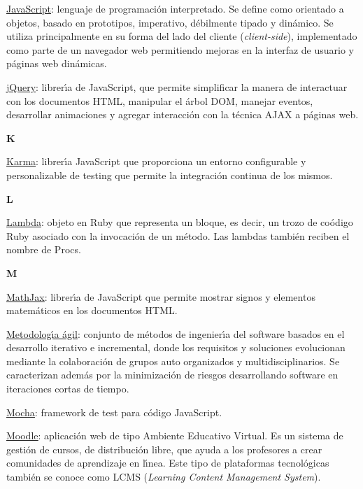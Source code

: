 \underline{JavaScript}: lenguaje de programaci\'on interpretado. Se define como orientado a objetos, basado en prototipos, imperativo, d\'ebilmente tipado y din\'amico. Se utiliza 
principalmente en su forma del lado del cliente (\textit{client-side}), implementado como parte de un navegador web permitiendo mejoras en la interfaz de usuario y p\'aginas web din\'amicas.
\bigskip

\href{https://jquery.com/}{\underline{jQuery}}: librer\'{\i}a de JavaScript, que permite simplificar la manera de interactuar con los documentos HTML, manipular el \'arbol DOM, manejar eventos, 
desarrollar animaciones y agregar interacci\'on con la t\'ecnica AJAX a p\'aginas web.
\bigskip

\bigskip
{\bfseries {\Huge K}}\label{Apendice1:K}
\bigskip
\bigskip

\href{https://karma-runner.github.io/0.12/index.html}{\underline{Karma}}: librer\'{\i}a JavaScript que proporciona un entorno configurable y personalizable de testing que permite la integraci\'on 
continua de los mismos.
\bigskip

\bigskip
{\bfseries {\Huge L}}\label{Apendice1:L}
\bigskip
\bigskip

\underline{Lambda}: objeto en Ruby que representa un bloque, es decir, un trozo de co\'odigo Ruby asociado con la invocaci\'on de un m\'etodo. Las lambdas tambi\'en reciben el nombre
de Procs.
\bigskip

\bigskip
{\bfseries {\Huge M}}\label{Apendice1:M}
\bigskip
\bigskip

\href{http://www.mathjax.org/}{\underline{MathJax}}: librer\'{\i}a de JavaScript que permite mostrar signos y elementos matem\'aticos en los documentos HTML.
\bigskip

\underline{Metodolog\'{\i}a \'agil}: conjunto de m\'etodos de ingenier\'{\i}a del software basados en el desarrollo iterativo e incremental, donde los requisitos y soluciones 
evolucionan mediante la colaboraci\'on de grupos auto organizados y multidisciplinarios. Se caracterizan adem\'as por la minimizaci\'on de riesgos desarrollando software en
iteraciones cortas de tiempo.
\bigskip

\href{https://visionmedia.github.io/mocha/}{\underline{Mocha}}: framework de test para c\'odigo JavaScript.
\bigskip

\href{https://moodle.org/?lang=es}{\underline{Moodle}}: aplicaci\'on web de tipo Ambiente Educativo Virtual. Es un sistema de gesti\'on de cursos, de distribuci\'on libre, que 
ayuda a los profesores a crear comunidades de aprendizaje en l\'{\i}nea. Este tipo de plataformas tecnol\'ogicas tambi\'en se conoce como LCMS (\textit{Learning Content Management System}).
\bigskip

